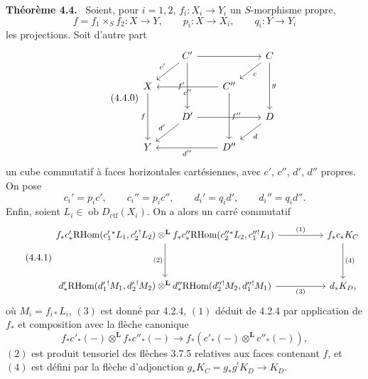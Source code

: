 \documentclass[11pt]{article}
\newenvironment{statement}[1]{\par\medskip\noindent\textbf{#1.}\ }{\par\medskip}
\newcommand{\ob}{\operatorname{ob}}
\providecommand{\RHom}{\mathrm{RHom}}
\providecommand{\Dctf}{D_{\mathrm{ctf}}}
\providecommand{\Dctf}{D_{\mathrm{ctf}}}
\providecommand{\RHom}{\mathrm{RHom}}
\providecommand{\ob}{\operatorname{ob}}
\providecommand{\RHom}{\mathrm R\mathcal{H}om}
\providecommand{\RHom}{\mathrm{RHom}}
\begin{document}
\begin{statement}{Théorème 4.4}
Soient, pour $i=1,2$, $f_i:X_i\longrightarrow Y_i$ un $S$-morphisme propre,
\[
f=f_1\times_S f_2:X\longrightarrow Y,\qquad
p_i:X\longrightarrow X_i,\qquad q_i:Y\longrightarrow Y_i
\]
les projections. Soit d'autre part
\begin{equation}
\tag{4.4.0}
\begin{tikzcd}[column sep=2.1em,row sep=1.6em]
& C' \arrow[rr] \arrow[dl,"c'"'] \arrow[dd,"f'"'] && C \arrow[dl,"c"] \arrow[dd,"g"] \\
X \arrow[dd,"f"'] && C'' \arrow[ll,"c''"] \arrow[dd,"f''"] \\
& D' \arrow[rr] \arrow[dl,"d'"'] && D \arrow[dl,"d"] \\
Y && D'' \arrow[ll,"d''"]
\end{tikzcd}
\end{equation}
un cube commutatif à faces horizontales cartésiennes, avec $c'$, $c''$, $d'$, $d''$ propres. On pose
\[
c_i'=p_i c',\qquad c_i''=p_i c'',\qquad d_i'=q_i d',\qquad d_i''=q_i d''.
\]
Enfin, soient $L_i\in\ob \Dctf(X_i)$. On a alors un carré commutatif
\begin{equation}
\tag{4.4.1}
\begin{tikzcd}[column sep=huge,row sep=huge]
f_*c'_*\RHom(c_1'{}^*L_1,c_2'{}^!L_2)\otimes^{\mathbf L}
f_*c''_*\RHom(c_2''{}^*L_2,c_1''{}^!L_1)
 \arrow[r,"(1)"] \arrow[d,"(2)"'] &
f_*c_*K_C \arrow[d,"(4)"] \\
d'_*\RHom(d_1'{}^!M_1,d_2'{}^!M_2)\otimes^{\mathbf L}
d''_*\RHom(d_2''{}^!M_2,d_1''{}^!M_1)
 \arrow[r,"(3)"'] &
d_*K_D ,
\end{tikzcd}
\end{equation}
où $M_i=f_{i*}L_i$, $(3)$ est donné par 4.2.4, $(1)$ déduit de 4.2.4 par application de $f_*$ et composition avec la flèche canonique
\[
f_*c'_*(-)\otimes^{\mathbf L} f_*c''_*(-)\longrightarrow f_*(c'_*(-)\otimes^{\mathbf L}c''_*(-)),
\]
$(2)$ est produit tensoriel des flèches 3.7.5 relatives aux faces contenant $f$, et $(4)$ est défini par la flèche d'adjonction $g_*K_C=g_*g^!K_D\longrightarrow K_D$.
\end{statement}
\end{document}
